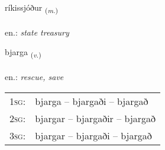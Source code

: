 \documentclass[frontgrid, backgrid]{flacards}\usepackage[]{graphicx}\usepackage[]{xcolor}
\begin{document}
\renewcommand{\flhead}{\vskip5pt \fboxsep=0pt {\small\bfseries\footnotesize Nafnorð | Noun}}
\renewcommand{\fcfoot}{\vskip5pt \fboxsep=0pt \hspace{2pt}{\small\bfseries\footnotesize 2K}}

\renewcommand{\blhead}{\vskip5pt {\small\bfseries\footnotesize Nafnorð | Noun }}
\renewcommand{\bcfoot}{\vskip5pt \hspace{2pt}{\small\bfseries\footnotesize 2K}}


{ríkissjóður \small{\textsubscript{(\textit{m.})}} \\[1ex] %
\textphonetic{[riːcɪsjouðʏr]} \\
en.: \emph{state treasury} \\  [2ex]
\renewcommand*{\arraystretch}{0.8}
}

\renewcommand{\flhead}{\vskip5pt \fboxsep=0pt {\small\bfseries\footnotesize Sagnorð | Verb}}
\renewcommand{\fcfoot}{\vskip5pt \fboxsep=0pt \hspace{2pt}{\small\bfseries\footnotesize 2K}}

\renewcommand{\blhead}{\vskip5pt {\small\bfseries\footnotesize Sagnorð | Verb }}
\renewcommand{\bcfoot}{\vskip5pt \hspace{2pt}{\small\bfseries\footnotesize 2K}}


{bjarga \small{\textsubscript{(\textit{v.})}} \\[1ex] %
\textphonetic{[pjarka]} \\
en.: \emph{rescue, save} \\  [2ex]
\renewcommand*{\arraystretch}{0.8}
\begin{tabular}{p{1cm}l}
\textsc{1sg}: & bjarga -- bjargaði -- bjargað \\ 
\textsc{2sg}: & bjargar -- bjargaðir -- bjargað \\ 
\textsc{3sg}: & bjargar -- bjargaði -- bjargað \\ 
\end{tabular}
}
\end{document}
